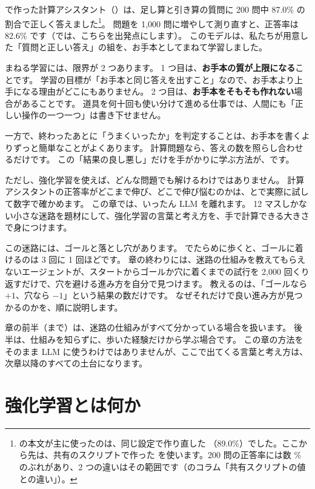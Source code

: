 で作った計算アシスタント（）は、足し算と引き算の質問に 200 問中 87.0\% の割合で正しく答えました\footnote{の本文が主に使ったのは、同じ設定で作り直した （89.0\%）でした。ここから先は、共有のスクリプトで作った  を使います。200 問の正答率には数 \% のぶれがあり、2 つの違いはその範囲です（のコラム「共有スクリプトの値との違い」）。}。
問題を 1,000 問に増やして測り直すと、正答率は 82.6\% です（では、こちらを出発点にします）。
このモデルは、私たちが用意した「質問と正しい答え」の組を、お手本としてまねて学習しました。

まねる学習には、限界が 2 つあります。
1 つ目は、\textbf{お手本の質が上限になる}ことです。
学習の目標が「お手本と同じ答えを出すこと」なので、お手本より上手になる理由がどこにもありません。
2 つ目は、\textbf{お手本をそもそも作れない}場合があることです。
道具を何十回も使い分けて進める仕事では、人間にも「正しい操作の一つ一つ」は書き下せません。

一方で、終わったあとに「うまくいったか」を判定することは、お手本を書くよりずっと簡単なことがよくあります。
計算問題なら、答えの数を照らし合わせるだけです。
この「結果の良し悪し」だけを手がかりに学ぶ方法が、です。

ただし、強化学習を使えば、どんな問題でも解けるわけではありません。
計算アシスタントの正答率がどこまで伸び、どこで伸び悩むのかは、とで実際に試して数字で確かめます。
この章では、いったん LLM を離れます。
12 マスしかない小さな迷路を題材にして、強化学習の言葉と考え方を、手で計算できる大きさで身につけます。

この迷路には、ゴールと落とし穴があります。
でたらめに歩くと、ゴールに着けるのは 3 回に 1 回ほどです。
章の終わりには、迷路の仕組みを教えてもらえないエージェントが、スタートからゴールか穴に着くまでの試行を 2,000 回くり返すだけで、穴を避ける進み方を自分で見つけます。
教えるのは、「ゴールなら $+1$、穴なら $-1$」という結果の数だけです。
なぜそれだけで良い進み方が見つかるのかを、順に説明します。

章の前半（まで）は、迷路の仕組みがすべて分かっている場合を扱います。
後半は、仕組みを知らずに、歩いた経験だけから学ぶ場合です。
この章の方法をそのまま LLM に使うわけではありませんが、ここで出てくる言葉と考え方は、次章以降のすべての土台になります。

\section{強化学習とは何か}\label{sec:rlb-what}

